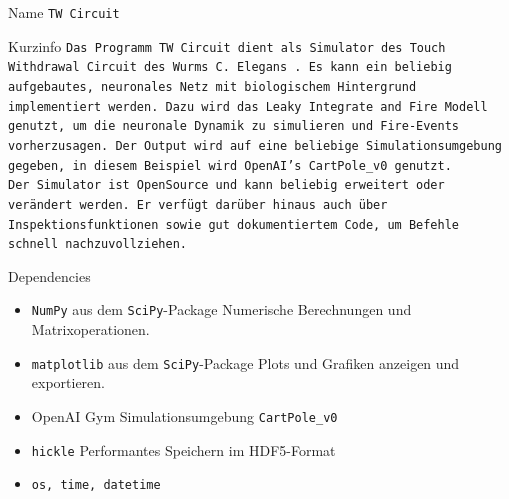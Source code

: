 \begin{minipage}[b]{0.61\textwidth}
	\begin{mybox}{Name}
		\texttt{TW Circuit}
	\end{mybox}
	\begin{mybox}{Kurzinfo}
		\texttt{Das Programm TW Circuit dient als Simulator des Touch Withdrawal Circuit des Wurms C. Elegans \cite{WormLevelRL}. Es kann ein beliebig aufgebautes, neuronales Netz mit biologischem Hintergrund implementiert werden. Dazu wird das Leaky Integrate and Fire Modell genutzt, um die neuronale Dynamik zu simulieren und Fire-Events vorherzusagen. Der Output wird auf eine beliebige Simulationsumgebung gegeben, in diesem Beispiel wird OpenAI's CartPole\_v0 genutzt.\\ Der Simulator ist OpenSource und kann beliebig erweitert oder verändert werden. Er verfügt darüber hinaus auch über Inspektionsfunktionen sowie gut dokumentiertem Code, um Befehle schnell nachzuvollziehen.}
	\end{mybox}
	\begin{mybox}{Dependencies}
		\begin{itemize}
			\item \texttt{NumPy} aus dem \texttt{SciPy}-Package
			\subitem Numerische Berechnungen und Matrixoperationen.
			\item \texttt{matplotlib} aus dem \texttt{SciPy}-Package
			\subitem Plots und Grafiken anzeigen und exportieren.
			\item OpenAI Gym
			\subitem Simulationsumgebung \texttt{CartPole\_v0}
			\item \texttt{hickle}
			\subitem Performantes Speichern im HDF5-Format
			\item \texttt{os, time, datetime}
		\end{itemize}
	\end{mybox}
\end{minipage}
\hfill
